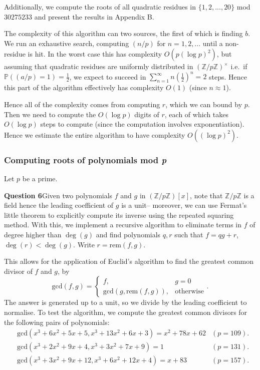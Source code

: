 \documentclass[12pt]{article}
\begin{document}


Additionally, we compute the roots of all quadratic residues in
\(\{1,2,...,20\}\) mod \(30275233\) and present the results in Appendix B.

The complexity of this algorithm can two sources, the first of which is finding
\(b\). We run an exhaustive search, computing \((n/p)\) for \(n=1,2,...\) until
a non-residue is hit. In the worst case this has complexity \(O(p(\log p)^2)\),
but assuming that quadratic residues are uniformly distributed in
\((\mathbb{Z}/p\mathbb{Z})^\times\) i.e.\ if \(\mathbb{P}((a/p)=1) =
\frac{1}{2}\), we expect to succeed in \(\sum_{n=1}^\infty n (\frac{1}{2})^n =
2\) steps. Hence this part of the algorithm effectively has complexity
\(O(1)\) (since \(n\approx 1\)). 

Hence all of the complexity comes from computing \(r\), which we can bound by
\(p\). Then we need to compute the \(O(\log p)\) digits of \(r\), each of
which takes \(O(\log p)\) steps to compute (since the computation involves
exponentiation). Hence we estimate the entire algorithm to have complexity
\(O((\log p)^2)\).

\subsubsection{Computing roots of polynomials mod \textit{p}}
Let \(p\) be a prime.

\textbf{Question 6}\quad Given two polynomials \(f\) and \(g\) in
\((\mathbb{Z}/p\mathbb{Z})[x]\), note that \(\mathbb{Z}/p\mathbb{Z}\) is a field
hence the leading coefficient of \(g\) is a unit-- moreover, we can use Fermat's
little theorem to explicitly compute its inverse using the repeated squaring
method. With this, we implement a recursive algorithm to eliminate terms in
\(f\) of degree higher than \(\deg(g)\) and find polynomials \(q,r\) such that
\(f = qg+r\), \(\deg(r)<\deg(g)\). Write \(r=\text{rem}(f,g)\). 

This allows for the application of Euclid's algorithm to find the greatest
common divisor of \(f\) and \(g\), by 
\[\text{gcd}(f,g) = \begin{cases} f, &g=0 \\
\text{gcd}(g,\text{rem}(f,g)),&\text{otherwise}\end{cases}.\]
The answer is generated up to a unit, so we divide by the leading coefficient to
normalise. To test the algorithm, we compute the greatest common divisors for
the following pairs of polynomials: 
\begin{align*}
    &\text{gcd}(x^3+6x^2+5x+5, x^3+13x^2+6x+3) = x^2 + 78x + 62 &(p=109). \\
    &\text{gcd}(x^3+2x^2+9x+4, x^3+3x^2+7x+9) = 1 &(p=131). \\
    &\text{gcd}(x^3+3x^2+9x+12, x^3+6x^2+12x+4) = x+83 &(p=157). \\
\end{align*}
\end{document}
